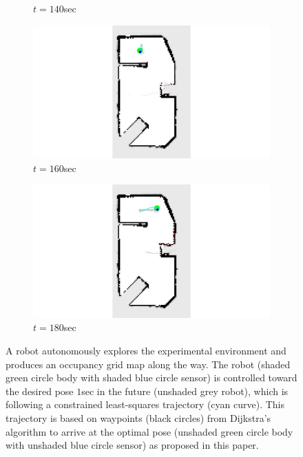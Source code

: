 \documentclass[smallextended]{svjour3}       %
\begin{document}
\begin{figure}
{\begin{subfigure}[b]{0.19\textwidth}
        		\caption{$t=140$sec}
        		\label{fig:Experiment_ogm_t3p5}
    	\end{subfigure}
	\begin{subfigure}[b]{0.19\textwidth}
        		\includegraphics[trim={13cm 1cm 13cm 0}, clip, width=\textwidth]{feb23_t160sec.jpg}
        		\caption{$t=160$sec}
        		\label{fig:Experiment_ogm_t4}
    	\end{subfigure}
	\begin{subfigure}[b]{0.19\textwidth}
        		\includegraphics[trim={13cm 1cm 13cm 0}, clip, width=\textwidth]{feb23_t180sec.jpg}
        		\caption{$t=180$sec}
        		\label{fig:Experiment_ogm_t4p5}
    	\end{subfigure}
	}
\caption{A robot autonomously explores the experimental environment and produces an occupancy grid map along the way. The robot (shaded green circle body with shaded blue circle sensor) is controlled toward the desired pose $1$sec in the future (unshaded grey robot), which is following a constrained least-squares trajectory (cyan curve). This trajectory is based on waypoints (black circles) from Dijkstra's algorithm to arrive at the optimal pose (unshaded green circle body with unshaded blue circle sensor) as proposed in this paper.}
\label{fig:ExperimentOGM}
\end{figure}
\end{document}
